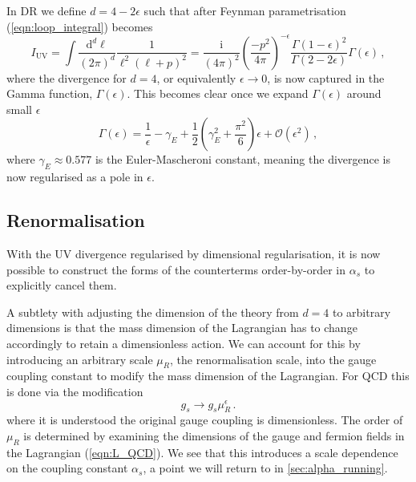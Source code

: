 \documentclass[main.tex]{subfiles}
\begin{document}
    In DR we define $d = 4 - 2\epsilon$ such that
    after Feynman parametrisation (\ref{eqn:loop_integral})
    becomes
    \begin{equation}\label{eqn:dim_reg}
        I_{\mathrm{UV}} = \int \dfrac{\mathrm{d}^{d}\ell}{(2\pi)^{d}}\dfrac{1}{\ell^{2}(\ell+p)^{2}} = \dfrac{\mathrm{i}}{(4\pi)^{2}}\left(\dfrac{-p^{2}}{4\pi}\right)^{-\epsilon}\dfrac{\Gamma(1-\epsilon)^{2}}{\Gamma(2-2\epsilon)}\Gamma(\epsilon) \, ,
    \end{equation}
    where the divergence for $d = 4$, or equivalently
    $\epsilon \rightarrow 0$, is now captured in the
    Gamma function, $\Gamma(\epsilon)$. This becomes clear once
    we expand $\Gamma(\epsilon)$ around small $\epsilon$
    \begin{equation}\label{eqn:gamma_laurent}
        \Gamma(\epsilon) = \dfrac{1}{\epsilon} - \gamma_{E} + \dfrac{1}{2}\left(\gamma_{E}^{2} + \dfrac{\pi^{2}}{6}\right)\epsilon + \mathcal{O}(\epsilon^{2}) \, ,
    \end{equation}
    where $\gamma_{E} \approx 0.577$ is the Euler-Mascheroni
    constant, meaning the divergence is now regularised as a pole in
    $\epsilon$.

\subsection{Renormalisation}\label{sec:renormalisation}
    With the UV divergence regularised by dimensional
    regularisation, it is now possible to construct the forms
    of the counterterms order-by-order in $\alpha_{s}$ to
    explicitly cancel them.

    A subtlety with adjusting the dimension of the theory
    from $d=4$ to arbitrary dimensions is that the mass dimension
    of the Lagrangian has to change accordingly to retain a
    dimensionless action. We can account for this by
    introducing an arbitrary scale $\mu_{R}$, the renormalisation
    scale, into the gauge coupling
    constant to modify the mass dimension of the Lagrangian.
    For QCD this is done via the modification
    \begin{equation}\label{eqn:dimensionful_coupling}
        g_{s} \rightarrow g_{s}\mu_{R}^{\epsilon} \, .
    \end{equation}
    where it is understood the original gauge coupling is
    dimensionless. The order of $\mu_{R}$ is determined by examining
    the dimensions of the gauge and fermion fields
    in the Lagrangian (\ref{eqn:L_QCD}).
    We see that this introduces a scale dependence
    on the coupling constant $\alpha_{s}$, a point we will return
    to in \ref{sec:alpha_running}.
\end{document}
